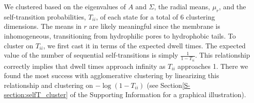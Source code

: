 \documentclass[journal=jpcbfk,manuscript=article]{achemso}
\begin{document}
  We clustered based on the eigenvalues of $A$ and $\Sigma$, the radial means, $\mu_r$, 
  and the self-transition probabilities, $T_{ii}$, of each state for a total of 6 clustering
  dimensions. The means in $r$ are likely meaningful since the membrane is inhomogeneous, 
  transitioning from hydrophilic pores to hydrophobic tails. To cluster on $T_{ii}$, we first
  cast it in terms of the expected dwell times. The expected value of the number of sequential
  self-transitions is simply $\frac{1}{1 - T_{ii}}$. This relationship correctly implies that 
  dwell times approach infinity as $T_{ii}$ approaches 1. There we found the most success with
  agglomerative clustering by linearizing this relationship and clustering on $-\log(1 - T_{ii})$
  (see Section\ref{S-section:selfT_cluster} of the Supporting Information for a graphical
  illustration).
  
%   
  
\end{document}
